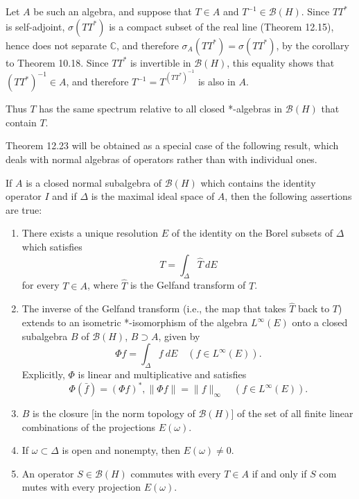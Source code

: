 Let $A$ be such an algebra, and suppose that $T \in A$ and $T^{-1} \in \mathcal{B}(H)$.
Since $TT^*$ is self-adjoint, $\sigma(TT^*)$ is a compact subset of the real line (Theorem 12.15), hence does not separate $\mathbb{C}$, and therefore $\sigma_A(TT^*) = \sigma(TT^*)$, by the corollary to Theorem 10.18.
Since $TT^*$ is invertible in $\mathcal{B}(H)$, this equality shows that $(TT^*)^{-1} \in A$, and therefore $T^{-1} = T^(TT^*)^{-1}$ is also in $A$.

Thus $T$ has the same spectrum relative to all closed *-algebras in $\mathcal{B}(H)$ that contain $T$.

Theorem 12.23 will be obtained as a special case of the following result, which deals with normal algebras of operators rather than with individual ones.

\begin{theorem}[12.22]

  If $A$ is a closed normal subalgebra of $\mathcal{B}(H)$ which contains the identity operator $I$ and if $\Delta$ is the maximal ideal space of $A$, then the following assertions are true:

  \begin{enumerate}
    \item \label{itm:a} There exists a unique resolution $E$ of the identity on the Borel subsets of $\Delta$ which satisfies
          \begin{equation}
            \label{eq:1}
            T = \int_\Delta \widehat{T} \ dE
          \end{equation}
          for every $T \in A$, where $\widehat{T}$ is the Gelfand transform of $T$.
    \item \label{itm:b} The inverse of the Gelfand transform (i.e., the map that takes $\widehat{T}$ back to $T$) extends to an isometric *-isomorphism of the algebra \(L^\infty(E)\) onto a closed subalgebra $B$ of $\mathcal{B}(H)$, $B\supset A$, given by
          \begin{equation}
            \label{eq:2}
            \Phi f = \int_\Delta f \ dE \quad (f \in L^\infty(E)).
          \end{equation}
          Explicitly, $\Phi$ is linear and multiplicative and satisfies
          \[
            \Phi(\bar{f}) = (\Phi f)^*, \| \Phi f \| = \| f \|_{\infty} \quad (f \in L^\infty(E)).
          \]
    \item \label{itm:c}  $B$ is the closure [in the norm topology of  $\mathcal{B}(H)$] of the set of all finite linear combinations of the projections $E(\omega)$.
    \item \label{itm:d}  If $\omega \subset \Delta$ is open and nonempty, then $E(\omega) \neq 0$.
    \item \label{itm:e}  An operator $S \in \mathcal{B}(H)$ commutes with every $T \in A$ if and only if $S$ com mutes with every projection $E(\omega)$.
  \end{enumerate}
\end{theorem}

